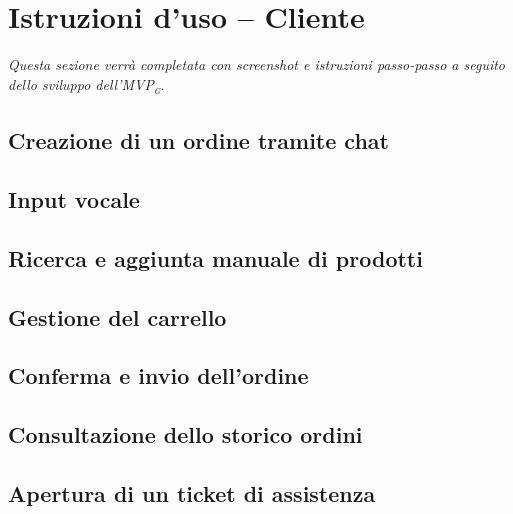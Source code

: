 \documentclass[a4paper, 11pt, oneside]{scrartcl}
\begin{document}
\newpage
\section{Istruzioni d'uso -- Cliente}
\textit{Questa sezione verr\`a completata con screenshot e istruzioni passo-passo a seguito dello sviluppo dell'MVP\textsubscript{\textsc{g}}.}

\subsection{Creazione di un ordine tramite chat}

\subsection{Input vocale}

\subsection{Ricerca e aggiunta manuale di prodotti}

\subsection{Gestione del carrello}

\subsection{Conferma e invio dell'ordine}

\subsection{Consultazione dello storico ordini}

\subsection{Apertura di un ticket di assistenza}

\newpage
\end{document}
